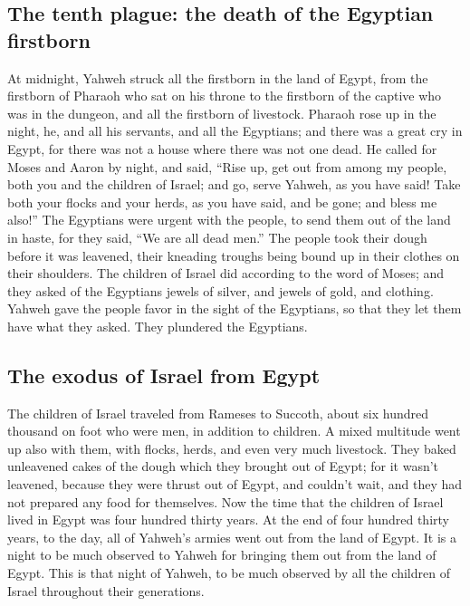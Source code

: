 \hypertarget{the-tenth-plague-the-death-of-the-egyptian-firstborn}{%
\subsection{The tenth plague: the death of the Egyptian
firstborn}\label{the-tenth-plague-the-death-of-the-egyptian-firstborn}}

 At midnight, Yahweh struck all the firstborn in the land
of Egypt, from the firstborn of Pharaoh who sat on his throne to the
firstborn of the captive who was in the dungeon, and all the firstborn
of livestock.  Pharaoh rose up in the night, he, and all
his servants, and all the Egyptians; and there was a great cry in Egypt,
for there was not a house where there was not one dead. 
He called for Moses and Aaron by night, and said, ``Rise up, get out
from among my people, both you and the children of Israel; and go, serve
Yahweh, as you have said!  Take both your flocks and your
herds, as you have said, and be gone; and bless me also!''
 The Egyptians were urgent with the people, to send them
out of the land in haste, for they said, ``We are all dead men.''
 The people took their dough before it was leavened,
their kneading troughs being bound up in their clothes on their
shoulders.  The children of Israel did according to the
word of Moses; and they asked of the Egyptians jewels of silver, and
jewels of gold, and clothing.  Yahweh gave the people
favor in the sight of the Egyptians, so that they let them have what
they asked. They plundered the Egyptians.

\hypertarget{the-exodus-of-israel-from-egypt}{%
\subsection{The exodus of Israel from
Egypt}\label{the-exodus-of-israel-from-egypt}}

 The children of Israel traveled from Rameses to Succoth,
about six hundred thousand on foot who were men, in addition to
children.  A mixed multitude went up also with them, with
flocks, herds, and even very much livestock.  They baked
unleavened cakes of the dough which they brought out of Egypt; for it
wasn't leavened, because they were thrust out of Egypt, and couldn't
wait, and they had not prepared any food for themselves. 
Now the time that the children of Israel lived in Egypt was four hundred
thirty years.  At the end of four hundred thirty years,
to the day, all of Yahweh's armies went out from the land of Egypt.
 It is a night to be much observed to Yahweh for bringing
them out from the land of Egypt. This is that night of Yahweh, to be
much observed by all the children of Israel throughout their
generations.

